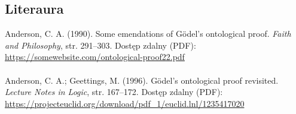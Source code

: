 \documentclass{eiti-raport}
\begin{document}
\begin{multicols}{2}
\section*{Literaura}

\noindent [Anderson, 1990] Anderson, C. A. (1990). Some emendations of G\"odel’s ontological proof. \textit{Faith and Philosophy}, str. 291–303. Dostęp zdalny (PDF): \url{https://somewebsite.com/ontological-proof22.pdf}  
\\ \\
\noindent [Anderson, 1996] Anderson, C. A.; Geettings, M. (1996). G\"odel’s ontological proof revisited. \textit{Lecture Notes in Logic}, str. 167–172. Dostęp zdalny (PDF): \url{https://projecteuclid.org/download/pdf_1/euclid.lnl/1235417020}


\end{multicols}
\end{document}
